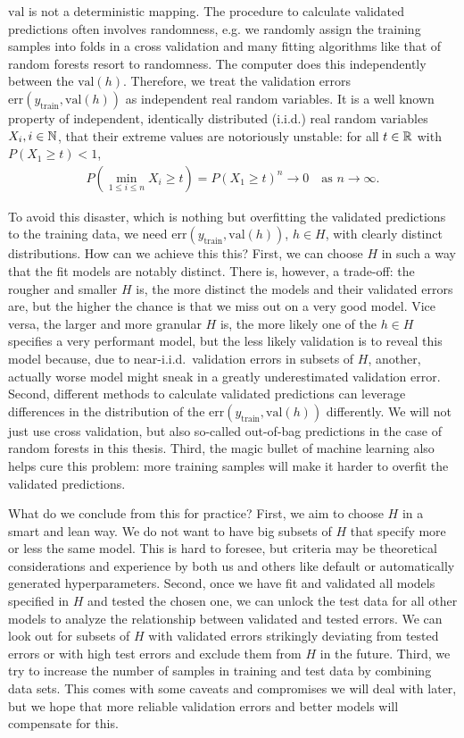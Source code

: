 $\text{val}$ is not a deterministic mapping. The procedure to calculate validated predictions often 
involves randomness, e.g. we randomly assign the training samples into folds in a cross validation 
and many fitting algorithms like that of random forests resort to randomness. The computer does this 
independently between the $\text{val}(h)$. Therefore, we treat the validation errors
$\text{err}(y_\text{train}, \text{val}(h))$ as independent 
real random variables. It is a well known property of independent, identically distributed (i.i.d.) 
real random variables $X_i, i \in \mathbb{N}$, that their extreme values are notoriously unstable: for all 
$t \in \mathbb{R}$ with $P(X_1 \geq t) < 1$, 
\begin{align}
    P\left( \min_{1 \leq i \leq n} X_i \geq t \right) = P(X_1 \geq t)^n \to 0 \quad
    \text{as } n \to \infty.
\end{align}

To avoid this disaster, which is nothing but overfitting the validated predictions to the training 
data, we need $\text{err}(y_\text{train}, \text{val}(h))$, $h \in H$, with clearly distinct 
distributions. 
How can we achieve this this? First, we can choose $H$ in such a way that the fit models are 
notably distinct. There is, however, a trade-off: the rougher and smaller $H$ is, the more distinct 
the models and their validated errors are, but the higher the chance is that we miss out on a very good 
model. Vice versa, the larger and more granular $H$ is, the more likely one of the $h \in H$ 
specifies a very performant model, but the less likely validation is to reveal this model because,
due to near-i.i.d.\ validation errors in subsets of $H$, another, actually worse model might sneak 
in a greatly underestimated validation error. Second, different methods to calculate validated
predictions can leverage differences in the distribution of the 
$\text{err}(y_\text{train}, \text{val}(h))$ differently. We will not just use cross validation, but 
also so-called out-of-bag predictions in the case of random forests in this thesis. Third, the 
magic bullet of machine learning also helps cure this problem: more training samples will make it 
harder to overfit the validated predictions.

What do we conclude from this for practice? First, we aim to choose $H$ in a smart and lean way. 
We do not want to have big subsets of $H$ that specify more or less the same model. This is hard 
to foresee, but criteria may be theoretical considerations and experience by both us and others 
like default or automatically generated hyperparameters. Second, once we have fit and validated 
all models specified in $H$ and tested the chosen one, we can unlock the test data for all other 
models to analyze the relationship between validated and tested errors. We can look out for subsets 
of $H$ with validated errors strikingly deviating from tested errors or with high test errors and 
exclude them from $H$ in the future. Third, we try to increase the number of samples in training 
and test data by combining data sets. This comes with some caveats and compromises we will deal with 
later, but we hope that more reliable validation errors and better models will compensate for this.

